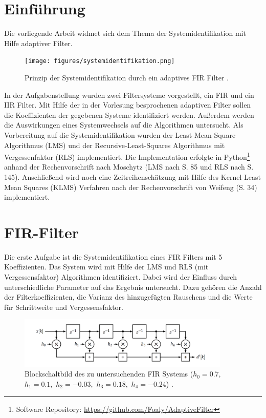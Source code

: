\section{Einführung}
\label{sec:intor}

Die vorliegende Arbeit widmet sich dem Thema der Systemidentifikation mit Hilfe adaptiver Filter.

\begin{figure}[H]
  \centering
  \texttt{[image: figures/systemidentifikation.png]}
  \caption{Prinzip der Systemidentifikation durch ein adaptives FIR Filter \cite{moschytz2000book}.}
  \label{fig:IIR_System}
\end{figure}

In der Aufgabenstellung \cite{aufgabenstellung} wurden zwei Filtersysteme vorgestellt, ein FIR und ein IIR Filter.
Mit Hilfe der in der Vorlesung besprochenen adaptiven Filter sollen die Koeffizienten der gegebenen Systeme identifiziert werden.
Außerdem werden die Auswirkungen eines Systemwechsels auf die Algorithmen untersucht.
Als Vorbereitung auf die Systemidentifikation wurden der Least-Mean-Square Algorithmus (LMS) und der Recursive-Least-Squares Algorithmus mit Vergessenfaktor (RLS) implementiert.
Die Implementation erfolgte in Python\footnote{Software Repository: \url{https://github.com/Foaly/AdaptiveFilter}} anhand der Rechenvorschrift nach Moschytz \cite{moschytz2000book} (LMS nach S. 85 und RLS nach S. 145).
Anschließend wird noch eine Zeitreihenschätzung mit Hilfe des Kernel Least Mean Squares (KLMS) Verfahren nach der Rechenvorschrift von Weifeng \cite{weifeng2010} (S. 34) implementiert.

\section{FIR-Filter}
\label{sec:fir}

Die erste Aufgabe ist die Systemidentifikation eines FIR Filters mit 5 Koeffizienten.
Das System wird mit Hilfe der LMS und RLS (mit Vergessensfaktor) Algorithmen identifiziert.
Dabei wird der Einfluss durch unterschiedliche Parameter auf das Ergebnis untersucht.
Dazu gehören die Anzahl der Filterkoeffizienten, die Varianz des hinzugefügten Rauschens und die Werte für Schrittweite und Vergessensfaktor.

\begin{figure}[H]
  \centering
      \includegraphics[width=0.9\textwidth]{figures/FIR_System.png}
 \caption{Blockschaltbild des zu untersuchenden FIR Systems (${h_0 = 0.7,}$ ${h_1 = 0.1,}$ ${h_2 = -0.03,}$ ${h_3 = 0.18,}$ ${h_4 = -0.24}$) \cite{aufgabenstellung}.}
	\label{fig:FIR_System}
\end{figure}

